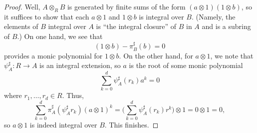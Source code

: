 \documentclass[../notes.tex]{subfiles}
\begin{document}
\begin{proof}
	Well, $A\otimes_RB$ is generated by finite sums of the form $(a\otimes 1)(1\otimes b)$, so it suffices to show that each $a\otimes 1$ and $1\otimes b$ is integral over $B$. (Namely, the elements of $B$ integral over $A$ is ``the integral closure'' of $B$ in $A$ and is a subring of $B$.) On one hand, we see that
	\[(1\otimes b)-\pi^\sharp_B(b)=0\]
	provides a monic polynomial for $1\otimes b$. On the other hand, for $a\otimes 1$, we note that $\psi^\sharp_A\colon R\to A$ is an integral extension, so $a$ is the root of some monic polynomial
	\[\sum_{k=0}^d\psi^\sharp_A(r_k)a^k=0\]
	where $r_1,\ldots,r_d\in R$. Thus,
	\[\sum_{k=0}^d\pi^\sharp_A(\psi^\sharp_Ar_k)(a\otimes1)^k=\Bigg(\sum_{k=0}^d\psi^\sharp_A(r_k)r^k\Bigg)\otimes1=0\otimes1=0,\]
	so $a\otimes1$ is indeed integral over $B$. This finishes.
\end{proof}
\end{document}
